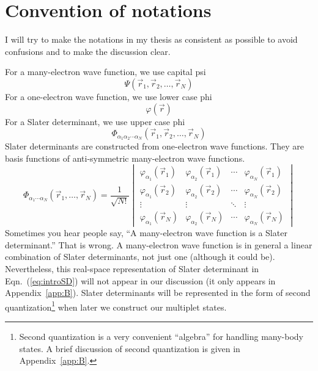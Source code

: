 \section{Convention of notations}
I will try to make the notations in my thesis as consistent as possible
to avoid confusions and to make the discussion clear.

For a many-electron wave function, we use capital psi
\begin{equation*}
\Psi(\vec{r}_1,\vec{r}_2,\ldots,\vec{r}_N)
\end{equation*}
For a one-electron wave function, we use lower case phi
\begin{equation*}
\varphi(\vec{r})
\end{equation*}
%
For a Slater determinant, we use upper case phi
\begin{equation*}
\Phi_{\alpha_1\alpha_2\cdots\alpha_N}(\vec{r}_1,\vec{r}_2,\ldots,\vec{r}_N)
\end{equation*}
%
Slater determinants are constructed from one-electron wave functions. They
are basis functions of anti-symmetric many-electron wave functions.
\begin{equation} \label{eq:introSD}
\Phi_{\alpha_1\cdots\alpha_N}(\vec{r}_1,\ldots,\vec{r}_N) = \frac{1}{\sqrt{N!}}
\begin{vmatrix}
\varphi_{\alpha_1}(\vec{r}_1) & \varphi_{\alpha_2}(\vec{r}_1) & \cdots & \varphi_{\alpha_N}(\vec{r}_1) \\
\varphi_{\alpha_1}(\vec{r}_2) & \varphi_{\alpha_2}(\vec{r}_2) & \cdots & \varphi_{\alpha_N}(\vec{r}_2) \\
\vdots & \vdots & \ddots & \vdots \\
\varphi_{\alpha_1}(\vec{r}_N) & \varphi_{\alpha_2}(\vec{r}_N) & \cdots & \varphi_{\alpha_N}(\vec{r}_N)
\end{vmatrix}
\end{equation}
%
Sometimes you hear people say, ``A many-electron wave function is a Slater determinant.''
That is wrong. A many-electron wave function is in general a linear combination of
Slater determinants, not just one (although it could be).
Nevertheless, this real-space representation of Slater determinant
in Eqn.~(\ref{eq:introSD}) will not appear in our discussion
(it only appears in Appendix~\ref{app:B}). Slater determinants will
be represented in the form of second quantization\footnote{Second quantization is
a very convenient ``algebra'' for handling many-body states. A brief discussion
of second quantization is given in Appendix~\ref{app:B}.} when later we
construct our multiplet states.



